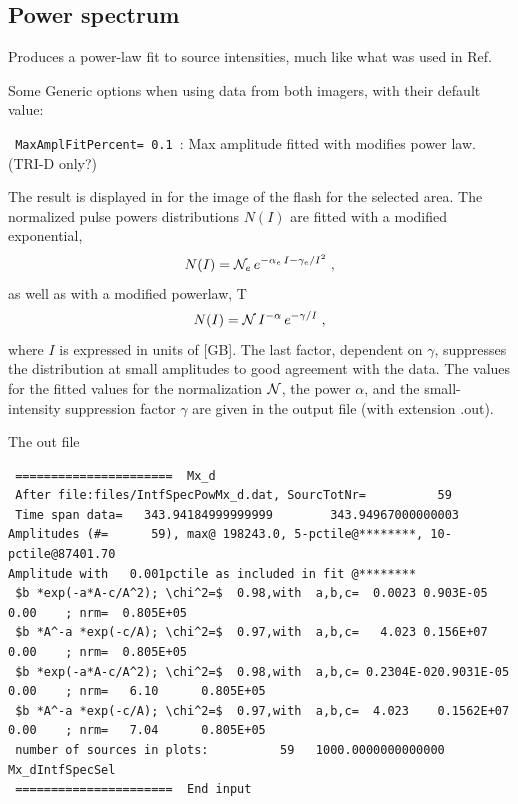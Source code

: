 \subsection{Power spectrum}
Produces a power-law fit to source intensities, much like what was used in Ref.~\cite{Machado:2021, Scholten:2021-INL}

Some Generic options when using data from both imagers, with their default value:
\begin{enumerate*}
\item \verb! MaxAmplFitPercent= 0.1 !: Max amplitude fitted with modifies power law. (TRI-D only?)
\end{enumerate*}

The result is displayed in  for the image of the flash for the selected area. The normalized pulse powers distributions $N(I)$ are fitted with a modified exponential,
\begin{equation}
N(I)= {\cal N}_e \,e^{-\alpha_e\,I-\gamma_e/I^2}\;, \eqlab{PowLaw}
\end{equation}
as well as with a modified powerlaw,
T\begin{equation}
N(I)= {\cal N} \,I^{-\alpha}  \,e^{-\gamma/I}\;, \eqlab{PowLaw}
\end{equation}
where $I$ is expressed in units of [GB]. The last factor, dependent on $\gamma$, suppresses the distribution at small amplitudes to good agreement with the data. The values for the fitted values for the normalization ${\cal N}$, the power $\alpha$, and the small-intensity suppression factor $\gamma$ are given in the output file (with extension .out).

The out file %

\begin{linenumbers}
\tiny
\resetlinenumber
\begin{verbatim}
 ======================  Mx_d
 After file:files/IntfSpecPowMx_d.dat, SourcTotNr=          59
 Time span data=   343.94184999999999        343.94967000000003
Amplitudes (#=      59), max@ 198243.0, 5-pctile@********, 10-pctile@87401.70
Amplitude with   0.001pctile as included in fit @********
 $b *exp(-a*A-c/A^2); \chi^2=$  0.98,with  a,b,c=  0.0023 0.903E-05   0.00    ; nrm=  0.805E+05
 $b *A^-a *exp(-c/A); \chi^2=$  0.97,with  a,b,c=   4.023 0.156E+07   0.00    ; nrm=  0.805E+05
 $b *exp(-a*A-c/A^2); \chi^2=$  0.98,with  a,b,c= 0.2304E-020.9031E-05   0.00    ; nrm=   6.10      0.805E+05
 $b *A^-a *exp(-c/A); \chi^2=$  0.97,with  a,b,c=  4.023    0.1562E+07   0.00    ; nrm=   7.04      0.805E+05
 number of sources in plots:          59   1000.0000000000000      Mx_dIntfSpecSel
 ======================  End input
\end{verbatim}
\end{linenumbers}

